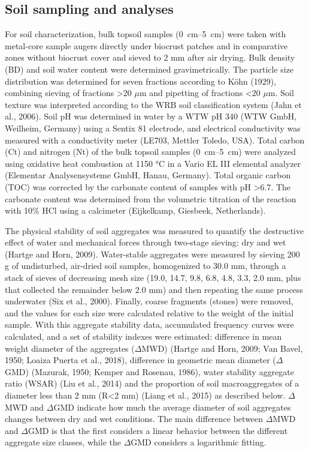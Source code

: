 \FloatBarrier

\subsection{Soil sampling and analyses}

For soil characterization, bulk topsoil samples (\SIrange[range-phrase=--,range-units=single]{0}{5}{\centi\meter}) were taken with metal-core sample augers directly under biocrust patches and in comparative zones without biocrust cover and sieved to 2 mm after air drying. Bulk density (BD) and soil water content were determined gravimetrically. The particle size distribution was determined for seven fractions according to Köhn (1929), combining sieving of fractions >20 $\mu$m and pipetting of fractions <20 $\mu$m. Soil texture was interpreted according to the WRB soil classification system (Jahn et al., 2006). Soil pH was determined in water by a WTW pH 340 (WTW GmbH, Weilheim, Germany) using a Sentix 81 electrode, and electrical conductivity was measured with a conductivity meter (LE703, Mettler Toledo, USA). Total carbon (Ct) and nitrogen (Nt) of the bulk topsoil samples (\SIrange[range-phrase=--,range-units=single]{0}{5}{\centi\meter}) were analyzed using oxidative heat combustion at 1150 °C in a Vario EL III elemental analyzer (Elementar Analysensysteme GmbH, Hanau, Germany). Total organic carbon (TOC) was corrected by the carbonate content of samples with pH >6.7. The carbonate content was determined from the volumetric titration of the reaction with 10\% HCl using a calcimeter (Eijkelkamp, Giesbeek, Netherlands).

The physical stability of soil aggregates was measured to quantify the destructive effect of water and mechanical forces through two-stage sieving: dry and wet (Hartge and Horn, 2009). Water-stable aggregates were measured by sieving 200 g of undisturbed, air-dried soil samples, homogenized to 30.0 mm, through a stack of sieves of decreasing mesh size (19.0, 14.7, 9.8, 6.8, 4.8, 3.3, 2.0 mm, plus that collected the remainder below 2.0 mm) and then repeating the same process underwater (Six et al., 2000). Finally, coarse fragments (stones) were removed, and the values for each size were calculated relative to the weight of the initial sample. With this aggregate stability data, accumulated frequency curves were calculated, and a set of stability indexes were estimated: difference in mean weight diameter of the aggregates ($\Delta$MWD) (Hartge and Horn, 2009; Van Bavel, 1950; Loaiza Puerta et al., 2018), difference in geometric mean diameter ($\Delta$GMD) (Mazurak, 1950; Kemper and Rosenau, 1986), water stability aggregate ratio (WSAR) (Liu et al., 2014) and the proportion of soil macroaggregates of a diameter less than 2 mm (R<2 mm) (Liang et al., 2015) as described below. $\Delta$MWD and $\Delta$GMD indicate how much the average diameter of soil aggregates changes between dry and wet conditions. The main difference between $\Delta$MWD and $\Delta$GMD is that the first considers a linear behavior between the different aggregate size classes, while the $\Delta$GMD considers a logarithmic fitting.


